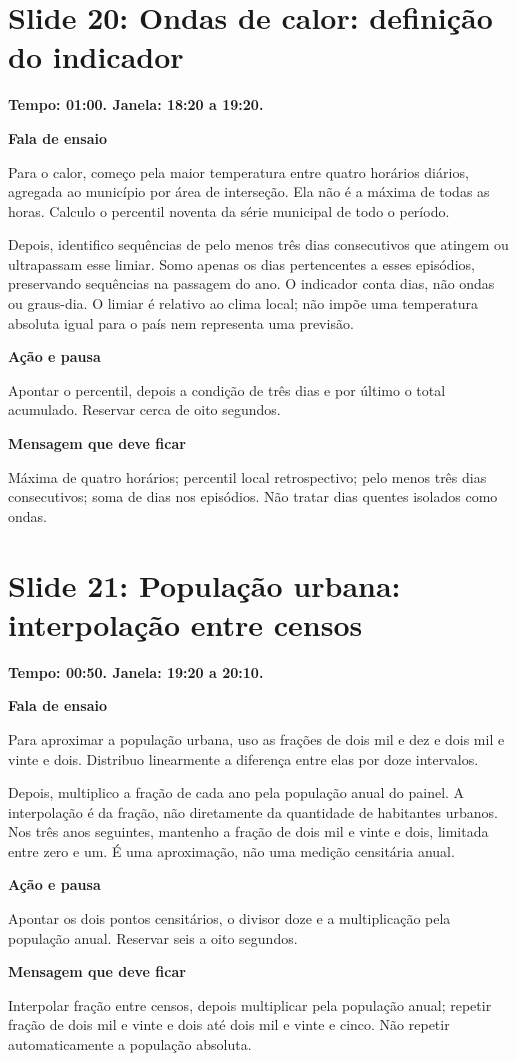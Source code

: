 \documentclass[11pt,a4paper]{article}
\newcommand{\bloco}[1]{\par\Needspace{3\baselineskip}\textbf{#1}\par}
\newcommand{\slide}[2]{\Needspace{13\baselineskip}\section*{Slide #1: #2}}
\begin{document}
\par\begin{minipage}{\textwidth}
\slide{20}{Ondas de calor: definição do indicador}
{\color{azul}\textbf{Tempo: 01:00. Janela: 18:20 a 19:20.}}\par
\bloco{Fala de ensaio}
Para o calor, começo pela maior temperatura entre quatro horários diários, agregada ao município por área de interseção. Ela não é a máxima de todas as horas. Calculo o percentil noventa da série municipal de todo o período.

Depois, identifico sequências de pelo menos três dias consecutivos que atingem ou ultrapassam esse limiar. Somo apenas os dias pertencentes a esses episódios, preservando sequências na passagem do ano. O indicador conta dias, não ondas ou graus-dia. O limiar é relativo ao clima local; não impõe uma temperatura absoluta igual para o país nem representa uma previsão.
\bloco{Ação e pausa}
Apontar o percentil, depois a condição de três dias e por último o total acumulado. Reservar cerca de oito segundos.
\bloco{Mensagem que deve ficar}
Máxima de quatro horários; percentil local retrospectivo; pelo menos três dias consecutivos; soma de dias nos episódios. Não tratar dias quentes isolados como ondas.
\end{minipage}\par\bigskip
\par\begin{minipage}{\textwidth}
\slide{21}{População urbana: interpolação entre censos}
{\color{azul}\textbf{Tempo: 00:50. Janela: 19:20 a 20:10.}}\par
\bloco{Fala de ensaio}
Para aproximar a população urbana, uso as frações de dois mil e dez e dois mil e vinte e dois. Distribuo linearmente a diferença entre elas por doze intervalos.

Depois, multiplico a fração de cada ano pela população anual do painel. A interpolação é da fração, não diretamente da quantidade de habitantes urbanos. Nos três anos seguintes, mantenho a fração de dois mil e vinte e dois, limitada entre zero e um. É uma aproximação, não uma medição censitária anual.
\bloco{Ação e pausa}
Apontar os dois pontos censitários, o divisor doze e a multiplicação pela população anual. Reservar seis a oito segundos.
\bloco{Mensagem que deve ficar}
Interpolar fração entre censos, depois multiplicar pela população anual; repetir fração de dois mil e vinte e dois até dois mil e vinte e cinco. Não repetir automaticamente a população absoluta.
\end{minipage}\par\bigskip
\end{document}

